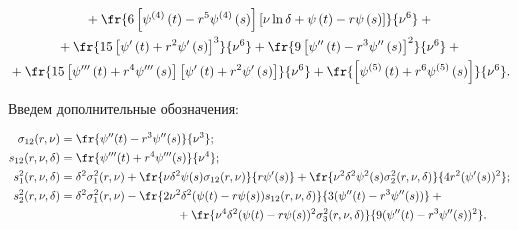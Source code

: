\begin{multline}


{} + \fr{6\left[\psi^{(4)}\left(t\right) - 


r^5\psi^{(4)}\left(s\right)\right]\left[\nu\ln\delta + \psi\left(t\right) - 


r\psi\left(s \right) \right]}{\nu^6} + {}\\


{} + \fr{ 15\left[\psi'\left(t\right)+ 


r^2\psi'\left(s\right)\right]^3}{\nu^6} +  \fr{9\left[\psi''\left(t\right)  - 


r^3\psi''\left(s\right)\right]^2}{\nu^6} + {}\\


{} + \fr{15\left[\psi'''\left(t\right) + 


r^4\psi'''\left(s\right)\right]\left[\psi'\left(t\right) + 


r^2\psi'\left(s\right) \right]}{\nu^6} +  \fr{\left[\psi^{(5)}\left(t\right) + 


r^6\psi^{(5)}\left(s\right)\right]}{\nu^6}.


\label{D_ln_3}


\end{multline}


Введем дополнительные обозначения:


\begin{align}




\sigma_{12}(r,\nu)&=


\fr{\psi''(t)-r^3\psi''(s)}{\nu^3};\notag


\\




s_{12}(r,\nu,\delta)&=


\fr{\psi'''(t)+r^4\psi'''(s)}{\nu^4};\notag


\\


s_1^2(r,\nu,\delta)&=


\delta^2 \sigma_1^2(r,\nu) + \fr{\nu\delta^2\psi(s)\sigma_{12}(r,\nu)}{r\psi'(s)}


+ \fr{\nu^2\delta^2\psi^2(s)\sigma_2^2(r,\nu,\delta)}{4r^2(\psi'(s))^2};


\label{theorem_2_variance}


\\


s_2^2(r,\nu,\delta)&=\delta^2\sigma_1^2(r,\nu) -


\fr{2\nu^2\delta^2(\psi(t)-r\psi(s))s_{12}(r,\nu,\delta)}{3(\psi''(t)- r^3\psi''(s))}


+{}\notag\\


&\hspace*{35mm}{}+\fr{\nu^4\delta^2(\psi(t)-r\psi(s))^2\sigma_3^2(r,\nu,\delta)}{9(\psi''(t)-


r^3\psi''(s))^2}.


\label{theorem_4_variance}


\end{align}






